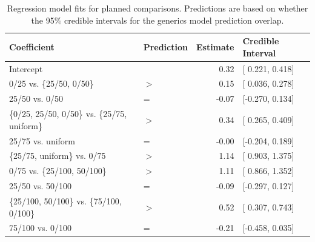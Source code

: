 \documentclass[floatsintext,doc]{apa6}
\begin{document}
\begin{table}[h]
\centering
\begingroup\fontsize{10pt}{11pt}\selectfont
\begin{tabular}{llrl}
  \hline
Coefficient & Prediction & Estimate & Credible Interval \\ 
  \hline
Intercept &  & 0.32 & [ 0.221, 0.418] \\ 
  0/25 vs. \{25/50, 0/50\} & $>$ & 0.15 & [ 0.036, 0.278] \\ 
  25/50 vs. 0/50 & = & -0.07 & [-0.270, 0.134] \\ 
  \{0/25, 25/50, 0/50\} vs. \{25/75, uniform\} & $>$ & 0.34 & [ 0.265, 0.409] \\ 
  25/75 vs. uniform & = & -0.00 & [-0.204, 0.189] \\ 
  \{25/75, uniform\} vs. 0/75 & $>$ & 1.14 & [ 0.903, 1.375] \\ 
  0/75 vs. \{25/100, 50/100\} & $>$ & 1.11 & [ 0.866, 1.352] \\ 
  25/50 vs. 50/100 & = & -0.09 & [-0.297, 0.127] \\ 
  \{25/100, 50/100\} vs. \{75/100, 0/100\} & $>$ & 0.52 & [ 0.307, 0.743] \\ 
  75/100 vs. 0/100 & = & -0.21 & [-0.458, 0.035] \\ 
   \hline
\end{tabular}
\endgroup
\caption{Regression model fits for planned comparisons. Predictions are based on whether the 95\% credible intervals for the generics model prediction overlap.} 
\end{table}
\end{document}
